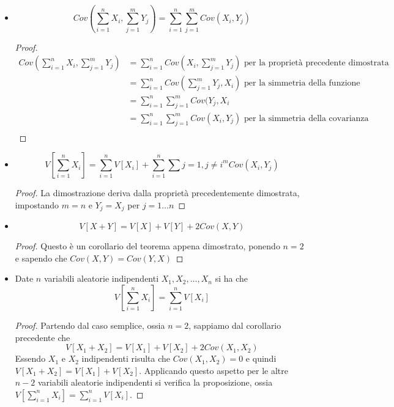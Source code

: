 \documentclass[a4paper,12pt, oneside]{book}
\begin{document}
\begin{itemize}
\begin{proof}
          \end{proof}
    \item \[ Cov(\sum _{i = 1}^n X_i, \sum_{j = 1} ^m Y_j) = \sum _{i = 1}^n \sum _{j = 1} ^m Cov(X_i, Y_j) \]
          \begin{proof}
              \[ \begin{split}
                  Cov(\sum _{i = 1}^n X_i, \sum_{j = 1} ^m Y_j) 
                        & = \sum _{i = 1}^n Cov(X_i, \sum _{j = 1}^m Y_j) \mbox{ per la proprietà precedente dimostrata}\\
                        & = \sum _{i = 1}^n Cov(\sum _{j = 1}^m Y_j, X_i) \mbox{ per la simmetria della funzione}\\
                        & = \sum _{i = 1}^n \sum _{j = 1}^m Cov(Y_j, X_i \\
                        & = \sum _{i = 1}^n \sum _{j = 1}^m Cov(X_i, Y_j) \mbox{ per la simmetria della covarianza}\\
                  \end{split} \]
          \end{proof}
    \item \[ V[\sum _{i = 1}^n X_i] = \sum _{i = 1}^n V[X_i] + \sum _{i = 1}^n \sum{j = 1, j \neq i}^m Cov(X_i, Y_j) \]
          \begin{proof}
              La dimostrazione deriva dalla proprietà precedentemente dimostrata, impostando $m = n$ e $Y_j = X_j$
              per $j = 1\dots n$
          \end{proof}
    \item \[ V[X + Y] = V[X] + V[Y] + 2Cov(X, Y) \]
          \begin{proof}
              Questo è un corollario del teorema appena dimostrato, ponendo $n = 2$ e sapendo che $Cov(X, Y) = Cov(Y, X)$
          \end{proof}
    \item Date $n$ variabili aleatorie indipendenti $X_1, X_2, \dots, X_n$ si ha che
          \[ V[\sum _{i = 1}^n X_i] = \sum _{i = 1}^n V[X_i] \]
          \begin{proof}
              Partendo dal caso semplice, ossia $n = 2$, sappiamo dal corollario precedente che 
              \[ V[X_1 + X_2] = V[X_1] + V[X_2] + 2Cov(X_1, X_2) \]
              Essendo $X_1$ e $X_2$ indipendenti risulta che $Cov(X_1, X_2) = 0$ e quindi $V[X_1 + X_2] = V[X_1] + V[X_2]$.\newline
              Applicando questo aspetto per le altre $n - 2$ variabili aleatorie indipendenti si verifica la
              proposizione, ossia $V[\sum _{i = 1}^n X_i] = \sum _{i = 1}^n V[X_i]$.
          \end{proof}
\end{itemize}
\end{document}
